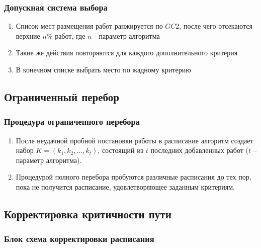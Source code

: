\begin{frame}
    \frametitle{Допускная система выбора}
    \begin{enumerate}
        \item Список мест размещения работ ранжируется по $GC2$, после чего отсекаются верхние $n\%$ работ, где $n$ - параметр алгоритма
        \item Такие же действия повторяются для каждого дополнительного критерия
        \item В конечном списке выбрать место по жадному критерию
    \end{enumerate}

\end{frame}


\subsection{Ограниченный перебор}
\begin{frame}
    \frametitle{Процедура ограниченного перебора}
    \begin{enumerate}
        \item После неудачной пробной постановки работы в расписание алгоритм создает набор $K=\left( k_1,k_2,\dots,k_t \right)$, состоящий из $t$ последних добавленных работ ($t$ – параметр алгоритма).
        \item Процедурой полного перебора пробуются различные расписания до тех пор, пока не получится расписание, удовлетворяющее заданным критериям.
    \end{enumerate}
\end{frame}

\subsection{Корректировка критичности пути}
\begin{frame}
    \frametitle{Блок схема корректировки расписания}
    {\tiny
    }
\end{frame}
